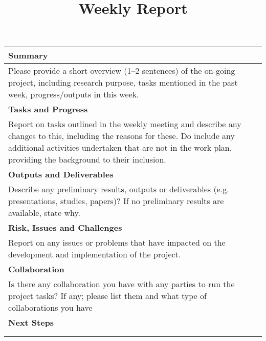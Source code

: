 \documentclass[a4paper]{article}
\title{Weekly Report}
\makeatletter
\newcommand{\Authorname}[0]{\@author\xspace}
\newcommand{\Item}[1]{\textbf{\large #1}}
\makeatother
\begin{document}
\mbox{}

\begin{longtable}{|p{2.2in}|p{4.64in}|}
  \firsthline
  \Item{Name:} & \Authorname\\
  \hline
  \Item{Project Name:} & \\
  \hline
  \Item{Reporting Period:} & Week\\
  \hline
  \multicolumn{2}{|p{\linewidth}|}{\Item{Summary}}\\
  \hline
  \multicolumn{2}{|p{\linewidth}|}{%
    Please provide a short overview (1--2 sentences) of the on-going project,
    including research purpose, tasks mentioned in the past week,
    progress/outputs in this week.
  }\\
  \hline
  \multicolumn{2}{|p{\linewidth}|}{\Item{Tasks and Progress}}\\
  \hline
  \multicolumn{2}{|p{\linewidth}|}{%
    Report on tasks outlined in the weekly meeting and describe any changes
    to this, including the reasons for these. Do include any additional
    activities undertaken that are not in the work plan, providing the
    background to their inclusion.
  }\\
  \hline
  \multicolumn{2}{|p{\linewidth}|}{\Item{Outputs and Deliverables}}\\
  \hline
  \multicolumn{2}{|p{\linewidth}|}{%
    Describe any preliminary results, outputs or deliverables (e.g.
    presentations, studies, papers)? If no preliminary results are available,
    state why.
  }\\
  \hline
  \multicolumn{2}{|p{\linewidth}|}{\Item{Risk, Issues and Challenges}}\\
  \hline
  \multicolumn{2}{|p{\linewidth}|}{%
    Report on any issues or problems that have impacted on the development
    and implementation of the project.
  }\\
  \hline
  \multicolumn{2}{|p{\linewidth}|}{\Item{Collaboration}}\\
  \hline
  \multicolumn{2}{|p{\linewidth}|}{%
    Is there any collaboration you have with any parties to run the project
    tasks? If any; please list them and what type of collaborations you have
  }\\
  \hline
  \multicolumn{2}{|p{\linewidth}|}{\Item{Next Steps}}\\
  \hline
  \multicolumn{2}{|p{\linewidth}|}{%
  }\\
  \lasthline
\end{longtable}
\end{document}
